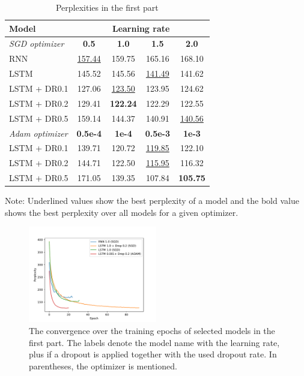 \documentclass[a4paper]{article}
\begin{document}
\begin{table}
  \caption{Perplexities in the first part}
  \label{tab:dataPart1}
  \begin{tabular}{l|c c c c}
    \toprule
    \textbf{Model} & \multicolumn{4}{c}{\textbf{Learning rate} } \\
    \midrule
    \textit{SGD optimizer} & \textbf{0.5}	& \textbf{1.0} & \textbf{1.5} & \textbf{2.0} \\
    \midrule
    RNN & \underline{157.44} & 159.75 & 165.16 & 168.10\\
    LSTM & 145.52 & 145.56 & \underline{141.49} & 141.62 \\
    LSTM + DR0.1 & 127.06 & \underline{123.50} & 123.95 & 124.62 \\
    LSTM + DR0.2 & 129.41 & \textbf{122.24} & 122.29 & 122.55 \\
    LSTM + DR0.5 & 159.14 & 144.37 & 140.91 & \underline{140.56} \\  
    \toprule
    \textit{Adam optimizer} & \textbf{0.5e-4} & \textbf{1e-4} & \textbf{0.5e-3} & \textbf{1e-3} \\
    \midrule
    LSTM + DR0.1 & 139.71 & 120.72 & \underline{119.85} & 122.10 \\
    LSTM + DR0.2 & 144.71 & 122.50 & \underline{115.95} & 116.32 \\
    LSTM + DR0.5 & 171.05 & 139.35 & 107.84 & \textbf{105.75} \\
    \bottomrule
  \end{tabular}
  \begin{minipage}{7.5cm}
    \vspace{0.1cm}
    Note: Underlined values show the best perplexity of a model and the bold value shows the best perplexity over all models for a given optimizer. 
  \end{minipage}
\end{table}

\begin{figure}[htbp]
  \centering
  \includegraphics[width=0.5\textwidth]{part1_convergence.pdf}
  \caption{The convergence over the training epochs of selected models in the first part. The labels denote the model name with the learning rate, plus if a dropout is applied together with the used dropout rate. In parentheses, the optimizer is mentioned.}
  \label{fig:part_1_convergence}  
\end{figure}
\end{document}
